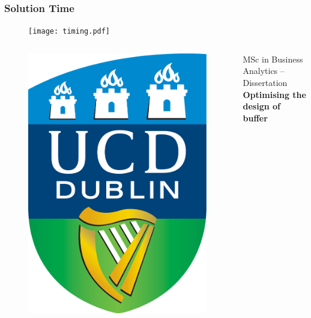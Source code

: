\documentclass{beamer}
\begin{document}
\begin{frame}
    \frametitle{Solution Time}
    \begin{figure}
        \centering
        \texttt{[image: timing.pdf]}
    \end{figure}
\end{frame}

\begin{frame}
    \begin{columns}
            \begin{figure}
                \centering
                \includegraphics[angle=0,scale=0.03]{ucd_logo.png}
            \end{figure}
        \centering MSc in Business Analytics -- Dissertation\\
        \large \textbf{Optimising the design of buffer 
}
\end{columns}
\end{frame}
\end{document}
